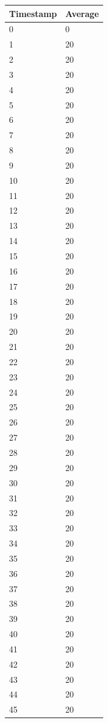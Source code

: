 %
%
\begin{tabular}{|l||l|}
\hline
	\textbf{Timestamp} & \textbf{Average} \\ \hline
	0 & 0 \\ \hline
	1 & 20 \\ \hline
	2 & 20 \\ \hline
	3 & 20 \\ \hline
	4 & 20 \\ \hline
	5 & 20 \\ \hline
	6 & 20 \\ \hline
	7 & 20 \\ \hline
	8 & 20 \\ \hline
	9 & 20 \\ \hline
	10 & 20 \\ \hline
	11 & 20 \\ \hline
	12 & 20 \\ \hline
	13 & 20 \\ \hline
	14 & 20 \\ \hline
	15 & 20 \\ \hline
	16 & 20 \\ \hline
	17 & 20 \\ \hline
	18 & 20 \\ \hline
	19 & 20 \\ \hline
	20 & 20 \\ \hline
	21 & 20 \\ \hline
	22 & 20 \\ \hline
	23 & 20 \\ \hline
	24 & 20 \\ \hline
	25 & 20 \\ \hline
	26 & 20 \\ \hline
	27 & 20 \\ \hline
	28 & 20 \\ \hline
	29 & 20 \\ \hline
	30 & 20 \\ \hline
	31 & 20 \\ \hline
	32 & 20 \\ \hline
	33 & 20 \\ \hline
	34 & 20 \\ \hline
	35 & 20 \\ \hline
	36 & 20 \\ \hline
	37 & 20 \\ \hline
	38 & 20 \\ \hline
	39 & 20 \\ \hline
	40 & 20 \\ \hline
	41 & 20 \\ \hline
	42 & 20 \\ \hline
	43 & 20 \\ \hline
	44 & 20 \\ \hline
	45 & 20 \\ \hline
\end{tabular}
